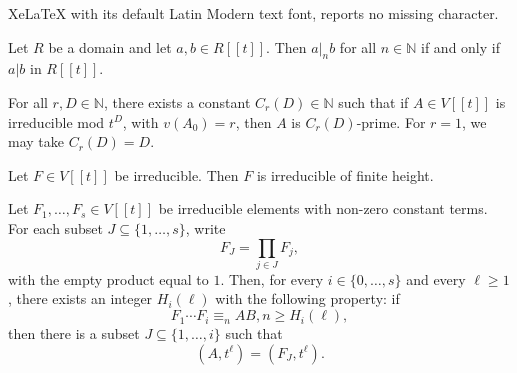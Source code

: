 \documentclass[10pt,a4paper]{amsart}
\newcommand{\N}{\mathbb{N}}
\begin{document}
XeLaTeX with its default Latin Modern text font, reports no missing character.
\begin{lemma}\label{lem_a|b} Let $R$ be a domain and let $a,b \in R[[t]]$. Then $a|_nb$ for all $n \in \N$ if and only if $a|b$ in $R[[t]]$. \end{lemma}

\begin{proposition}\label{quasi-prime}
For all $r,D\in\mathbb{N}$, there exists a constant $C_r(D)\in\mathbb{N}$ such that if $A\in V[[t]]$ is irreducible mod $t^D$, with $v(A_0)=r$, then $A$ is $C_r(D)$-prime. For $r=1$, we may take $C_r(D)=D$.
\end{proposition}

\begin{proposition}
    \label{theorem_over_dvr} Let $F \in V[[t]]$ be irreducible. Then $F$ is irreducible of finite height.
\end{proposition}

\begin{lemma}
Let $F_1,\ldots,F_s\in V[[t]]$  
be irreducible elements with non-zero constant terms. For each subset
$J\subseteq \{1,\ldots,s\}$, write
$$
F_J=\prod_{j\in J}F_j,
$$
with the empty product equal to $1$. Then, for every
$i\in\{0,\ldots,s\}$ and every $\ell \geq 1$, there exists an integer
$H_i(\ell)$ with the following property: if
$$
F_1\cdots F_i\equiv_n AB, n\ge H_i(\ell),
$$
then there is a subset $J\subseteq \{1,\ldots,i\}$ such that
$$
(A,t^\ell)=(F_J,t^\ell).
$$
\end{lemma}
\end{document}
